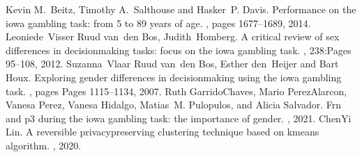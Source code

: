 \documentclass[letterpaper,10pt,english]{jupyterBook}
\begin{document}
\begin{sphinxthebibliography}{1}
\sphinxAtStartPar
Kevin M. Beitz, Timothy A. Salthouse and Hasker P. Davis. Performance on the iowa gambling task: from 5 to 89 years of age. , pages 1677–1689, 2014.
\sphinxAtStartPar
Leoniede Visser Ruud van den Bos, Judith Homberg. A critical review of sex differences in decision\sphinxhyphen{}making tasks: focus on the iowa gambling task. , 238:Pages 95–108, 2012.
\sphinxAtStartPar
Suzanna Vlaar Ruud van den Bos, Esther den Heijer and Bart Houx. Exploring gender differences in decision\sphinxhyphen{}making using the iowa gambling task. , pages Pages 1115–1134, 2007.
\sphinxAtStartPar
Ruth Garrido\sphinxhyphen{}Chaves, Mario Perez\sphinxhyphen{}Alarcon, Vanesa Perez, Vanesa Hidalgo, Matias M. Pulopulos, and Alicia Salvador. Frn and p3 during the iowa gambling task: the importance of gender. , 2021.
\sphinxAtStartPar
Chen\sphinxhyphen{}Yi Lin. A reversible privacy\sphinxhyphen{}preserving clustering technique based on k\sphinxhyphen{}means algorithm. , 2020.
\end{sphinxthebibliography}







\renewcommand{\indexname}{Index}
\printindex
\end{document}

